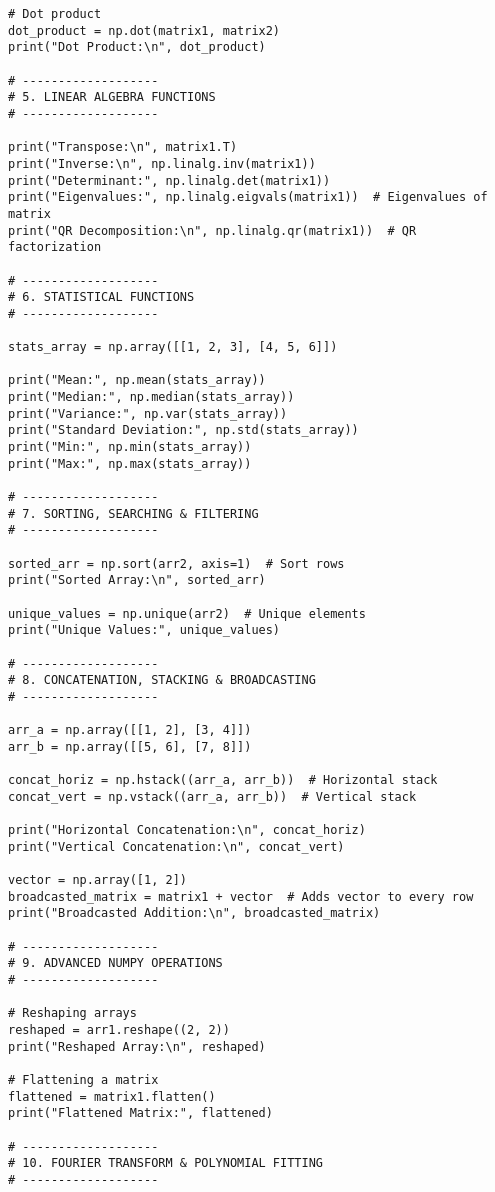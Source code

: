 \begin{verbatim}
# Dot product
dot_product = np.dot(matrix1, matrix2)
print("Dot Product:\n", dot_product)

# -------------------
# 5. LINEAR ALGEBRA FUNCTIONS
# -------------------

print("Transpose:\n", matrix1.T)
print("Inverse:\n", np.linalg.inv(matrix1))
print("Determinant:", np.linalg.det(matrix1))
print("Eigenvalues:", np.linalg.eigvals(matrix1))  # Eigenvalues of matrix
print("QR Decomposition:\n", np.linalg.qr(matrix1))  # QR factorization

# -------------------
# 6. STATISTICAL FUNCTIONS
# -------------------

stats_array = np.array([[1, 2, 3], [4, 5, 6]])

print("Mean:", np.mean(stats_array))
print("Median:", np.median(stats_array))
print("Variance:", np.var(stats_array))
print("Standard Deviation:", np.std(stats_array))
print("Min:", np.min(stats_array))
print("Max:", np.max(stats_array))

# -------------------
# 7. SORTING, SEARCHING & FILTERING
# -------------------

sorted_arr = np.sort(arr2, axis=1)  # Sort rows
print("Sorted Array:\n", sorted_arr)

unique_values = np.unique(arr2)  # Unique elements
print("Unique Values:", unique_values)

# -------------------
# 8. CONCATENATION, STACKING & BROADCASTING
# -------------------

arr_a = np.array([[1, 2], [3, 4]])
arr_b = np.array([[5, 6], [7, 8]])

concat_horiz = np.hstack((arr_a, arr_b))  # Horizontal stack
concat_vert = np.vstack((arr_a, arr_b))  # Vertical stack

print("Horizontal Concatenation:\n", concat_horiz)
print("Vertical Concatenation:\n", concat_vert)

vector = np.array([1, 2])
broadcasted_matrix = matrix1 + vector  # Adds vector to every row
print("Broadcasted Addition:\n", broadcasted_matrix)

# -------------------
# 9. ADVANCED NUMPY OPERATIONS
# -------------------

# Reshaping arrays
reshaped = arr1.reshape((2, 2))
print("Reshaped Array:\n", reshaped)

# Flattening a matrix
flattened = matrix1.flatten()
print("Flattened Matrix:", flattened)

# -------------------
# 10. FOURIER TRANSFORM & POLYNOMIAL FITTING
# -------------------


\end{verbatim}

